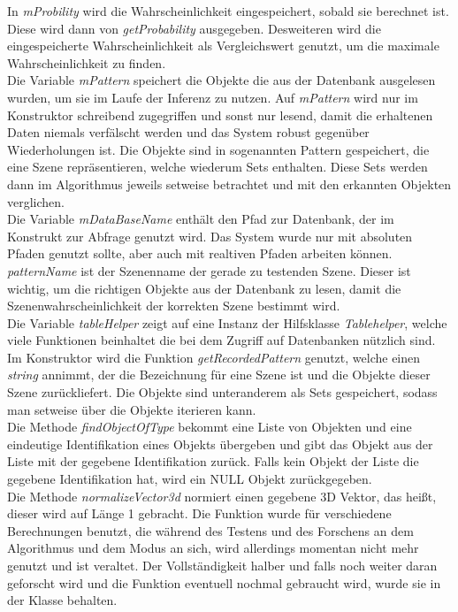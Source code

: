 In \textit{mProbility} wird die Wahrscheinlichkeit eingespeichert, sobald sie berechnet ist. Diese wird dann von \textit{getProbability} ausgegeben. Desweiteren wird die eingespeicherte Wahrscheinlichkeit als Vergleichswert genutzt, um die maximale Wahrscheinlichkeit zu finden.\smallskip\\
Die Variable \textit{mPattern} speichert die Objekte die aus der Datenbank ausgelesen wurden, um sie im Laufe der Inferenz zu nutzen. Auf \textit{mPattern} wird nur im Konstruktor schreibend zugegriffen und sonst nur lesend, damit die erhaltenen Daten niemals verfälscht werden und das System robust gegenüber Wiederholungen ist. Die Objekte sind in sogenannten Pattern gespeichert, die eine Szene repräsentieren, welche wiederum Sets enthalten. Diese Sets werden dann im Algorithmus jeweils setweise betrachtet und mit den erkannten Objekten verglichen.\smallskip\\
Die Variable \textit{mDataBaseName} enthält den Pfad zur Datenbank, der im Konstrukt zur Abfrage genutzt wird. Das System wurde nur mit absoluten Pfaden genutzt sollte, aber auch mit realtiven Pfaden arbeiten können.\smallskip\\
\textit{patternName} ist der Szenenname der gerade zu testenden Szene. Dieser ist wichtig, um die richtigen Objekte aus der Datenbank zu lesen, damit die Szenenwahrscheinlichkeit der korrekten Szene bestimmt wird.\smallskip\\
Die Variable \textit{tableHelper} zeigt auf eine Instanz der Hilfsklasse \textit{Tablehelper}, welche viele Funktionen beinhaltet die bei dem Zugriff auf Datenbanken nützlich sind. Im Konstruktor wird die Funktion \textit{getRecordedPattern} genutzt, welche einen \textit{string} annimmt, der die Bezeichnung für eine Szene ist und die Objekte dieser Szene zurückliefert. Die Objekte sind unteranderem als Sets gespeichert, sodass man setweise über die Objekte iterieren kann.\smallskip\\
Die Methode \textit{findObjectOfType} bekommt eine Liste von Objekten und eine eindeutige Identifikation eines Objekts übergeben und gibt das Objekt aus der Liste mit der gegebene Identifikation zurück. Falls kein Objekt der Liste die gegebene Identifikation hat, wird ein NULL Objekt zurückgegeben.\smallskip\\
Die Methode \textit{normalizeVector3d} normiert einen gegebene 3D Vektor, das heißt, dieser wird auf Länge 1 gebracht. Die Funktion wurde für verschiedene Berechnungen benutzt, die während des Testens und des Forschens an dem Algorithmus und dem Modus an sich, wird allerdings momentan nicht mehr genutzt und ist veraltet. Der Vollständigkeit halber und falls noch weiter daran geforscht wird und die Funktion eventuell nochmal gebraucht wird, wurde sie in der Klasse behalten.\smallskip\\

